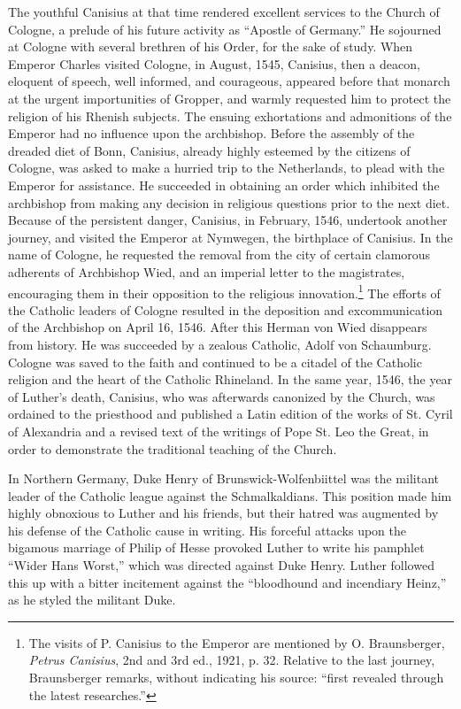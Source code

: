 The youthful Canisius at that time rendered excellent services to
the Church of Cologne, a prelude of his future activity as “Apostle
of Germany.” He sojourned at Cologne with several brethren of his
Order, for the sake of study. When Emperor Charles visited Cologne,
in August, 1545, Canisius, then a deacon, eloquent of speech, well
informed, and courageous, appeared before that monarch at the urgent importunities
of Gropper, and warmly requested him to protect
the religion of his Rhenish subjects. The ensuing exhortations and admonitions
of the Emperor had no influence upon the archbishop.
Before the assembly of the dreaded diet of Bonn, Canisius, already
highly esteemed by the citizens of Cologne, was asked to make a
hurried trip to the Netherlands, to plead with the Emperor for assistance.
He succeeded in obtaining an order which inhibited the archbishop from
making any decision in religious questions prior to the
next diet. Because of the persistent danger, Canisius, in February,
1546, undertook another journey, and visited the Emperor at Nymwegen,
the birthplace of Canisius. In the name of Cologne, he requested
the removal from the city of certain clamorous adherents of
Archbishop Wied, and an imperial letter to the magistrates, encouraging
them in their opposition to the religious innovation.\footnote
{The visits of P. Canisius to the Emperor are mentioned by O. Braunsberger, \textit{Petrus
Canisius}, 2nd and 3rd ed., 1921, p. 32. Relative to the last journey, Braunsberger remarks,
without indicating his source: “first revealed through the latest researches.”}
The efforts
of the Catholic leaders of Cologne resulted in the deposition and excommunication
of the Archbishop on April 16, 1546. After this
Herman von Wied disappears from history. He was succeeded by a
zealous Catholic, Adolf von Schaumburg. Cologne was saved to
the faith and continued to be a citadel of the Catholic religion and
the heart of the Catholic Rhineland. In the same year, 1546, the year
of Luther’s death, Canisius, who was afterwards canonized by the
Church, was ordained to the priesthood and published a Latin edition
of the works of St. Cyril of Alexandria and a revised text of the
writings of Pope St. Leo the Great, in order to demonstrate the traditional
teaching of the Church.

In Northern Germany, Duke Henry of Brunswick-Wolfenbiittel
was the militant leader of the Catholic league against the Schmalkaldians.
This position made him highly obnoxious to Luther and his
friends, but their hatred was augmented by his defense of the Catholic
cause in writing. His forceful attacks upon the bigamous marriage
of Philip of Hesse provoked Luther to write his pamphlet
“Wider Hans Worst,” which was directed against Duke Henry.
Luther followed this up with a bitter incitement against the “bloodhound
and incendiary Heinz,” as he styled the militant Duke.

